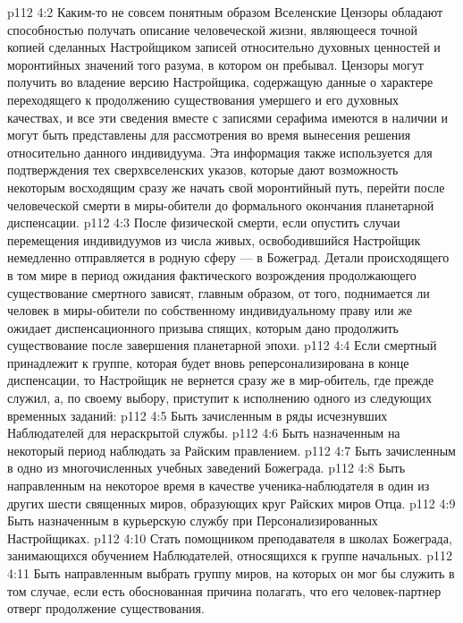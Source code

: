 \vs p112 4:2 Каким\hyp{}то не совсем понятным образом Вселенские Цензоры обладают способностью получать описание человеческой жизни, являющееся точной копией сделанных Настройщиком записей относительно духовных ценностей и моронтийных значений того разума, в котором он пребывал. Цензоры могут получить во владение версию Настройщика, содержащую данные о характере переходящего к продолжению существования умершего и его духовных качествах, и все эти сведения вместе с записями серафима имеются в наличии и могут быть представлены для рассмотрения во время вынесения решения относительно данного индивидуума. Эта информация также используется для подтверждения тех сверхвселенских указов, которые дают возможность некоторым восходящим сразу же начать свой моронтийный путь, перейти после человеческой смерти в миры\hyp{}обители до формального окончания планетарной диспенсации.
\vs p112 4:3 После физической смерти, если опустить случаи перемещения индивидуумов из числа живых, освободившийся Настройщик немедленно отправляется в родную сферу --- в Божеград. Детали происходящего в том мире в период ожидания фактического возрождения продолжающего существование смертного зависят, главным образом, от того, поднимается ли человек в миры\hyp{}обители по собственному индивидуальному праву или же ожидает диспенсационного призыва спящих, которым дано продолжить существование после завершения планетарной эпохи.
\vs p112 4:4 Если смертный принадлежит к группе, которая будет вновь реперсонализирована в конце диспенсации, то Настройщик не вернется сразу же в мир\hyp{}обитель, где прежде служил, а, по своему выбору, приступит к исполнению одного из следующих временных заданий:
\vs p112 4:5 \bibnobreakspace Быть зачисленным в ряды исчезнувших Наблюдателей для нераскрытой службы.
\vs p112 4:6 \bibnobreakspace Быть назначенным на некоторый период наблюдать за Райским правлением.
\vs p112 4:7 \bibnobreakspace Быть зачисленным в одно из многочисленных учебных заведений Божеграда.
\vs p112 4:8 \bibnobreakspace Быть направленным на некоторое время в качестве ученика\hyp{}наблюдателя в один из других шести священных миров, образующих круг Райских миров Отца.
\vs p112 4:9 \bibnobreakspace Быть назначенным в курьерскую службу при Персонализированных Настройщиках.
\vs p112 4:10 \bibnobreakspace Стать помощником преподавателя в школах Божеграда, занимающихся обучением Наблюдателей, относящихся к группе начальных.
\vs p112 4:11 \bibnobreakspace Быть направленным выбрать группу миров, на которых он мог бы служить в том случае, если есть обоснованная причина полагать, что его человек\hyp{}партнер отверг продолжение существования.
